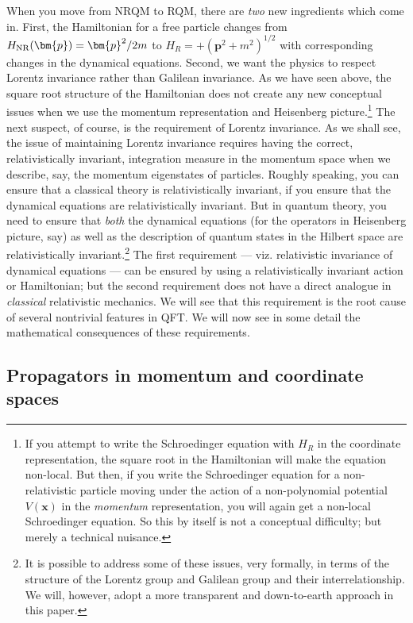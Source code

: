 \documentclass{article}
\begin{document}
 
When you move from NRQM to RQM, there are \textit{two}  new ingredients which come in. First, the Hamiltonian for a free particle changes from $H_{\rm NR}(\bm{p}) = \bm{p}^2/2m$ to $H_R=+(\bm{p}^2 + m^2)^{1/2}$ with corresponding changes in the dynamical equations. Second, we want the physics to respect Lorentz invariance rather than Galilean invariance. 
As we have seen above, the square root structure of the Hamiltonian does not create any new conceptual issues when we use the momentum representation and Heisenberg picture.\footnote{If you attempt to write the Schroedinger equation with $H_R$ in the coordinate representation, the square root in the Hamiltonian will make the equation non-local. But then, if you write the Schroedinger equation for a non-relativistic particle moving under the action of  a non-polynomial potential $V(\bm{x})$ in the \textit{momentum} representation, you will again get a non-local Schroedinger equation. So this by itself is not a conceptual difficulty; but merely a technical nuisance.}
The next suspect, of course, is the requirement of Lorentz invariance. As we shall see,
 the issue of maintaining Lorentz invariance requires having the correct, relativistically invariant, integration measure in the momentum space when we describe, say, the momentum eigenstates of particles.  Roughly speaking, you can ensure that a classical theory is relativistically invariant, if you ensure that the dynamical equations are relativistically invariant. But in quantum theory, you need to ensure that \textit{both} the dynamical equations (for the operators in Heisenberg picture, say) as well as the description of quantum states in the Hilbert space are relativistically invariant.\footnote{It is possible to address some of these issues, very formally, in terms of the structure of the Lorentz group and Galilean group and their interrelationship. We will, however, adopt a more transparent and down-to-earth approach in this paper.} The first requirement --- viz. relativistic invariance of dynamical equations --- can be ensured by using a relativistically invariant action or Hamiltonian; but the second requirement  does not have a direct analogue in \textit{classical} relativistic mechanics. We will see that this requirement is the root cause of several nontrivial features in QFT.
  We will now see in some detail the mathematical consequences of these requirements.
  
  \subsection{Propagators in momentum and coordinate spaces}
 
\end{document}
